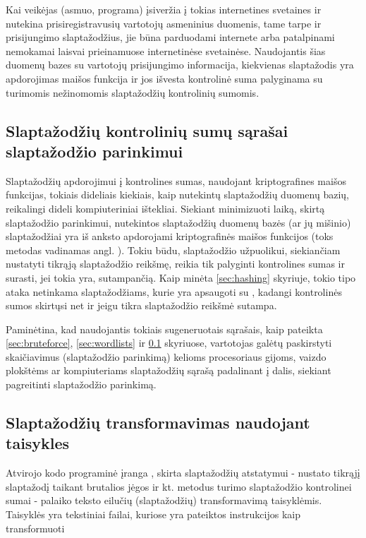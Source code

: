 \documentclass{VUMIFInfBakalaurinis}
\begin{document}
Kai veikėjas (asmuo, programa) įsiveržia į tokias internetines svetaines ir 
nutekina prisiregistravusių vartotojų asmeninius duomenis, tame tarpe ir 
prisijungimo slaptažodžius, jie būna parduodami internete arba patalpinami 
nemokamai laisvai prieinamuose internetinėse svetainėse.
Naudojantis šias duomenų bazes su vartotojų prisijungimo informacija, kiekvienas 
slaptažodis yra apdorojimas maišos funkcija ir jos išvesta kontrolinė suma 
palyginama su turimomis nežinomomis slaptažodžių kontrolinių sumomis.

\subsection{Slaptažodžių kontrolinių sumų sąrašai slaptažodžio parinkimui} 
\label{sec:rainbowtables}
Slaptažodžių apdorojimui į kontrolines sumas, naudojant kriptografines maišos 
funkcijas, tokiais dideliais kiekiais, kaip nutekintų slaptažodžių duomenų 
bazių, reikalingi dideli kompiuteriniai ištekliai. Siekiant minimizuoti laiką, 
skirtą slaptažodžio parinkimui, nutekintos slaptažodžių duomenų bazės (ar jų 
mišinio) slaptažodžiai yra iš anksto apdorojami kriptografinės maišos funkcijos 
(toks metodas vadinamas angl. ). Tokiu būdu, 
slaptažodžio užpuolikui, siekiančiam nustatyti tikrąją slaptažodžio reikšmę, 
reikia tik palyginti kontrolines sumas ir surasti, jei tokia yra, sutampančią. 
Kaip minėta \ref{sec:hashing} skyriuje, tokio tipo ataka netinkama 
slaptažodžiams, kurie yra apsaugoti su , kadangi kontrolinės 
sumos skirtųsi net ir jeigu tikra slaptažodžio reikšmė sutampa.

Paminėtina, kad naudojantis tokiais sugeneruotais sąrašais, kaip pateikta 
\ref{sec:bruteforce}, \ref{sec:wordlists} ir \ref{sec:rainbowtables} skyriuose, 
vartotojas galėtų paskirstyti skaičiavimus (slaptažodžio parinkimą) kelioms 
procesoriaus gijoms, vaizdo plokštėms ar kompiuteriams slaptažodžių sąrašą 
padalinant į dalis, siekiant pagreitinti slaptažodžio parinkimą.

\subsection{Slaptažodžių transformavimas naudojant taisykles}
Atvirojo kodo programinė įranga \footnotemark, skirta 
slaptažodžių atstatymui - nustato tikrąjį slaptažodį taikant brutalios jėgos ir 
kt. metodus turimo slaptažodžio kontrolinei sumai - palaiko teksto eilučių 
(slaptažodžių) transformavimą taisyklėmis. Taisyklės yra tekstiniai failai, 
kuriose yra pateiktos instrukcijos kaip transformuoti 
\end{document}
